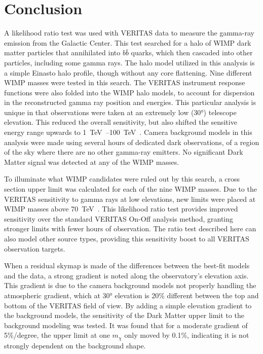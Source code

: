 \cleartooddpage[\thispagestyle{empty}]
\chapter{Conclusion}

A likelihood ratio test was used with VERITAS data to measure the gamma-ray emission from the Galactic Center.
This test searched for a halo of WIMP dark matter particles that annihilated into $b\bar{b}$ quarks, which then cascaded into other particles, including some gamma rays.
The halo model utilized in this analysis is a simple Einasto halo profile, though without any core flattening.
Nine different WIMP masses were tested in this search.
The VERITAS instrument response functions were also folded into the WIMP halo models, to account for dispersion in the reconstructed gamma ray position and energies.
This particular analysis is unique in that observations were taken at an extremely low (\nicetilde{}\ang{30}) telescope elevation.
This reduced the overall sensitivity, but also shifted the sensitive energy range upwards to \SIrange{1}{100}{\TeV{}}.
Camera background models in this analysis were made using several hours of dedicated dark observations, of a region of the sky where there are no other gamma-ray emitters.
No significant Dark Matter signal was detected at any of the WIMP masses.

To illuminate what WIMP candidates were ruled out by this search, a cross section upper limit was calculated for each of the nine WIMP masses.
Due to the VERITAS sensitivity to \TeV{} gamma rays at low elevations, new limits were placed at WIMP masses above \SI{70}{\TeV{}}.
This likelihood ratio test provides improved sensitivity over the standard VERITAS On-Off analysis method, granting stronger limits with fewer hours of observation.
The ratio test described here can also model other source types, providing this sensitivity boost to all VERITAS observation targets.

When a residual skymap is made of the differences between the best-fit models and the data, a strong gradient is noted along the observatory's elevation axis.
This gradient is due to the camera background models not properly handling the atmospheric gradient, which at \ang{30} elevation is \nicetilde{}20\% different between the top and bottom of the VERITAS field of view.
By adding a simple elevation gradient to the background models, the sensitivity of the Dark Matter upper limit to the background modeling was tested.
It was found that for a moderate gradient of 5\%/degree, the upper limit at one $m_{\chi}$ only moved by 0.1\%, indicating it is not strongly dependent on the background shape.


